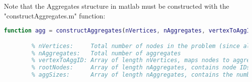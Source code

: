Note that the Aggregates structure in matlab must be constructed with the "constructAggregates.m" function:

\begin{lstlisting}[language=Matlab]
    function agg = constructAggregates(nVertices, nAggregates, vertexToAggID, rootNodes, aggSizes);

        % nVertices:     Total number of nodes in the problem (since all MueMex problems are serial)
        % nAggregates:   Total number of aggregates
        % vertexToAggID: Array of length nVertices, maps nodes to aggregate IDs
        % rootNodes:     Array of length nAggregates, contains node IDs of all the aggregate roots
        % aggSizes:      Array of length nAggregates, contains the number of nodes in each aggregate
\end{lstlisting}
